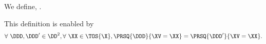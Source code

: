 \begin{definition}
  We define, \probdef.%
\end{definition}

\begin{justification}
  This definition is enabled by 
  $$\forall\ \DDD, \DDD' \in \DD^2, \forall\ \XX \in \TOS{\X}, \PRSQ{\DDD}{\XV = \XX} 
  = 
  \PRSQ{\DDD'}{\XV = \XX}.$$%
\end{justification}
